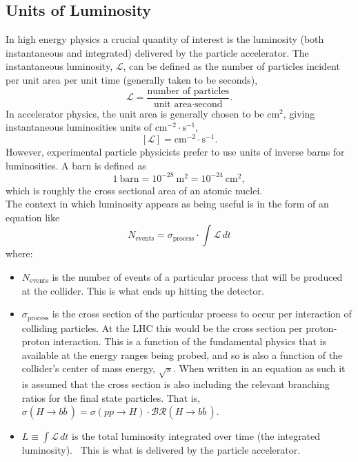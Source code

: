 \subsection{Units of Luminosity}\label{subsection:luminosity_units}
In high energy physics a crucial quantity of interest is the luminosity (both instantaneous and integrated) delivered by the particle accelerator.
The instantaneous luminosity, $\mathscr{L}$, can be defined as the number of particles incident per unit area per unit time (generally taken to be seconds),
\begin{equation}
 \mathscr{L} = \frac{\text{number of particles}}{\text{unit area} \cdot \text{second}}.
 \label{eq:instantaneous_luminosity}
\end{equation}
In accelerator physics, the unit area is generally chosen to be $\textrm{cm}^2$, giving instantaneous luminosities units of $\textrm{cm}^{-2} \cdot \textrm{s}^{-1}$,
\[
 \left[\mathscr{L}\right] = \textrm{cm}^{-2} \cdot \textrm{s}^{-1}.
\]
However, experimental particle physicists prefer to use units of inverse barns for luminosities. A barn is defined as
\begin{equation}
 1~\textrm{barn} = 10^{-28}~\textrm{m}^2 = 10^{-24}~\textrm{cm}^2,
 \label{eq:barn_to_area}
\end{equation}
which is roughly the cross sectional area of an atomic nuclei.~\cite{web:history_physics_purdue,history:etymology_barn}\\

The context in which luminosity appears as being useful is in the form of an equation like
\[
 N_{\textrm{events}} = \sigma_{\textrm{process}} \cdot \int \mathscr{L}\,dt
\]
where:
\begin{itemize}
 \item $N_{\text{events}}$ is the number of events of a particular process that will be produced at the collider.
       This is what ends up hitting the detector.
 \item $\sigma_{\textrm{process}}$ is the cross section of the particular process to occur per interaction of colliding particles.
       At the \Gls{LHC} this would be the cross section per proton-proton interaction.
       This is a function of the fundamental physics that is available at the energy ranges being probed, and so is also a function of the collider's center of mass energy, $\sqrt{s}$.
       When written in an equation as such it is assumed that the cross section is also including the relevant branching ratios for the final state particles.
       That is, $\sigma\left(H \to b\bar{b}\,\right) = \sigma\left(pp \to H\right) \cdot \mathcal{BR}\left(H \to b\bar{b}\,\right)$.
 \item $L \equiv \int \mathscr{L}\,dt$ is the total luminosity integrated over time (the integrated luminosity).~\cite{Herr:941318}
       This is what is delivered by the particle accelerator.
\end{itemize}


